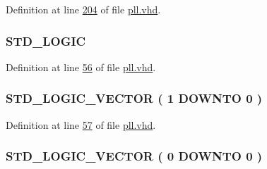 Definition at line \hyperlink{pll_8vhd_source_l00204}{204} of file \hyperlink{pll_8vhd_source}{pll.\+vhd}.

\hypertarget{classpll_1_1_s_y_n_aca40f2d2e88330e7729fc8f89d1e2366}{}
\subsubsection[{sub\+\_\+wire0}]{ {\bfseries \textcolor{comment}{S\+T\+D\+\_\+\+L\+O\+G\+I\+C}\textcolor{vhdlchar}{ }} \hspace{0.3cm}{\ttfamily [Signal]}}\label{classpll_1_1_s_y_n_aca40f2d2e88330e7729fc8f89d1e2366}


Definition at line \hyperlink{pll_8vhd_source_l00056}{56} of file \hyperlink{pll_8vhd_source}{pll.\+vhd}.

\hypertarget{classpll_1_1_s_y_n_a325f96af17ccfcff0f437d73da993aff}{}
\subsubsection[{sub\+\_\+wire1}]{ {\bfseries \textcolor{comment}{S\+T\+D\+\_\+\+L\+O\+G\+I\+C\+\_\+\+V\+E\+C\+T\+O\+R}\textcolor{vhdlchar}{ }\textcolor{vhdlchar}{(}\textcolor{vhdlchar}{ }\textcolor{vhdlchar}{ } \textcolor{vhdldigit}{1} \textcolor{vhdlchar}{ }\textcolor{keywordflow}{D\+O\+W\+N\+T\+O}\textcolor{vhdlchar}{ }\textcolor{vhdlchar}{ } \textcolor{vhdldigit}{0} \textcolor{vhdlchar}{ }\textcolor{vhdlchar}{)}\textcolor{vhdlchar}{ }} \hspace{0.3cm}{\ttfamily [Signal]}}\label{classpll_1_1_s_y_n_a325f96af17ccfcff0f437d73da993aff}


Definition at line \hyperlink{pll_8vhd_source_l00057}{57} of file \hyperlink{pll_8vhd_source}{pll.\+vhd}.

\hypertarget{classpll_1_1_s_y_n_a205f2292eed10dd71c2a24fab09e93ae}{}
\subsubsection[{sub\+\_\+wire2}]{ {\bfseries \textcolor{comment}{S\+T\+D\+\_\+\+L\+O\+G\+I\+C\+\_\+\+V\+E\+C\+T\+O\+R}\textcolor{vhdlchar}{ }\textcolor{vhdlchar}{(}\textcolor{vhdlchar}{ }\textcolor{vhdlchar}{ } \textcolor{vhdldigit}{0} \textcolor{vhdlchar}{ }\textcolor{keywordflow}{D\+O\+W\+N\+T\+O}\textcolor{vhdlchar}{ }\textcolor{vhdlchar}{ } \textcolor{vhdldigit}{0} \textcolor{vhdlchar}{ }\textcolor{vhdlchar}{)}\textcolor{vhdlchar}{ }} \hspace{0.3cm}{\ttfamily [Signal]}}\label{classpll_1_1_s_y_n_a205f2292eed10dd71c2a24fab09e93ae}


